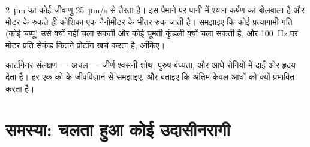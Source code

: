 \begin{exercise}[$\star\star\star$]\label{exo:b3:cytoskeleton-motility:11}
\qty{2}{\micro m} का कोई जीवाणु \qty{25}{\micro m/s} से तैरता है। इस
पैमाने पर पानी में श्यान कर्षण का बोलबाला है और मोटर के रुकते ही कोशिका
एक नैनोमीटर के भीतर रुक जाती है। समझाइए कि कोई प्रत्यागामी गति (कोई
चप्पू) उसे क्यों नहीं चला सकती और कोई घूमती कुंडली क्यों चला सकती है,
और \qty{100}{Hz} पर मोटर प्रति सेकंड कितने प्रोटॉन खर्च करता है, आँकिए।
\end{exercise}

\begin{exercise}[$\star\star\star$]\label{exo:b3:cytoskeleton-motility:12}
कार्टागेनर संलक्षण --- अचल  --- जीर्ण श्वसनी-शोथ, पुरुष
बंध्यता, और आधे रोगियों में दाईं ओर हृदय देता है। हर एक को  के
जीवविज्ञान से समझाइए, और बताइए कि अंतिम केवल आधों को क्यों प्रभावित
करता है।
\end{exercise}

\section{समस्या: चलता हुआ कोई उदासीनरागी}

